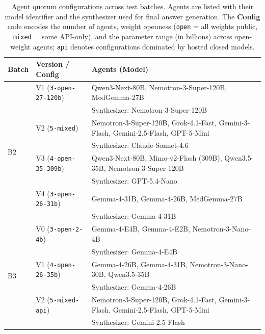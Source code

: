 \begin{table}[ht]
  \centering
  \caption{Agent quorum configurations across test batches. Agents are listed with their model identifier and the synthesizer used for final answer generation. The \textbf{Config} code encodes the number of agents, weight openness (\texttt{open} = all weights public, \texttt{mixed} = some API-only), and the parameter range (in billions) across open-weight agents; \texttt{api} denotes configurations dominated by hosted closed models.}
  \label{tab:quorum-batches}
  \begin{tabularx}{\textwidth}{llX}
    \toprule
    \textbf{Batch} & \textbf{Version / Config} & \textbf{Agents (Model)} \\
    \midrule
    \multirow{8}{*}{B2}& V1 (\texttt{3-open-27-120b})      & Qwen3-Next-80B, Nemotron-3-Super-120B, MedGemma-27B \\
    &                                      & Synthesizer: Nemotron-3-Super-120B \\
    & V2 (\texttt{5-mixed})                & Nemotron-3-Super-120B, Grok-4.1-Fast, Gemini-3-Flash, Gemini-2.5-Flash, GPT-5-Mini \\
    &                                      & Synthesizer: Claude-Sonnet-4.6 \\
    & V3 (\texttt{4-open-35-309b})         & Qwen3-Next-80B, Mimo-v2-Flash (309B), Qwen3.5-35B, Nemotron-3-Super-120B \\
    &                                      & Synthesizer: GPT-5.4-Nano \\
    & V4 (\texttt{3-open-26-31b})          & Gemma-4-31B, Gemma-4-26B, MedGemma-27B \\
    &                                      & Synthesizer: Gemma-4-31B \\
    \midrule
    \multirow{8}{*}{B3} & V0 (\texttt{3-open-2-4b})         & Gemma-4-E4B, Gemma-4-E2B, Nemotron-3-Nano-4B \\
    &                                      & Synthesizer: Gemma-4-E4B \\
    & V1 (\texttt{4-open-26-35b})          & Gemma-4-26B, Gemma-4-31B, Nemotron-3-Nano-30B, Qwen3.5-35B \\
    &                                      & Synthesizer: Gemma-4-26B \\
    & V2 (\texttt{5-mixed-api})            & Nemotron-3-Super-120B, Grok-4.1-Fast, Gemini-3-Flash, Gemini-2.5-Flash, GPT-5-Mini \\
    &                                      & Synthesizer: Gemini-2.5-Flash \\

\end{tabularx}
\end{table}
